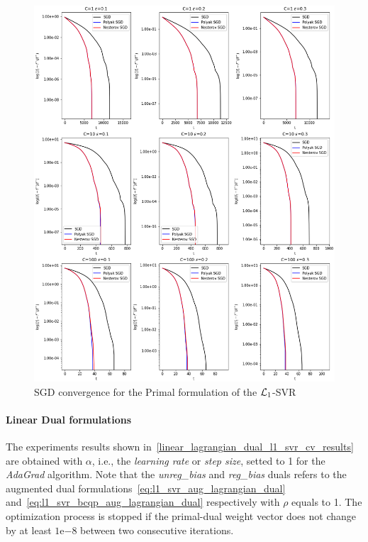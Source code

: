 \begin{figure}[H]
	\centering
	\includegraphics[scale=0.5]{img/l1_svr_loss_history}
	\caption{SGD convergence for the Primal formulation of the $\protect \mathcal{L}_1$-SVR}
	\label{fig:l1_svr_loss_history}
\end{figure}

\pagebreak

\paragraph{Linear Dual formulations}

The experiments results shown in~\ref{linear_lagrangian_dual_l1_svr_cv_results} are obtained with $\alpha$, i.e., the \emph{learning rate} or \emph{step size}, setted to 1 for the \emph{AdaGrad} algorithm. Note that the \emph{unreg\_bias} and \emph{reg\_bias} duals refers to the augmented dual formulations~\eqref{eq:l1_svr_aug_lagrangian_dual} and~\eqref{eq:l1_svr_bcqp_aug_lagrangian_dual} respectively with $\rho$ equals to 1. The optimization process is stopped if the primal-dual weight vector does not change by at least $1\mathrm{e}{-8}$  between two consecutive iterations.

